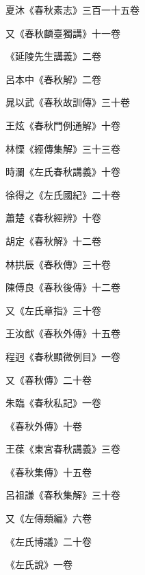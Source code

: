 \begin{pinyinscope}
 夏沐《春秋素志》三百一十五卷



 又《春秋麟臺獨講》十一卷



 《延陵先生講義》二卷



 呂本中《春秋解》二卷



 晁以武《春秋故訓傳》三十卷



 王炫《春秋門例通解》十卷



 林慄《經傳集解》三十三卷



 時瀾《左氏春秋講義》十卷



 徐得之《左氏國紀》二十卷



 蕭楚《春秋經辨》十卷



 胡定《春秋解》十二卷



 林拱辰《春秋傳》三十卷



 陳傅良《春秋後傳》十二卷



 又《左氏章指》三十卷



 王汝猷《春秋外傳》十五卷



 程迥《春秋顯微例目》一卷



 又《春秋傳》二十卷



 朱臨《春秋私記》一卷



 《春秋外傳》十卷



 王葆《東宮春秋講義》三卷



 《春秋集傳》十五卷



 呂祖謙《春秋集解》三十卷



 又《左傳類編》六卷



 《左氏博議》二十卷



 《左氏說》一卷




\end{pinyinscope}
